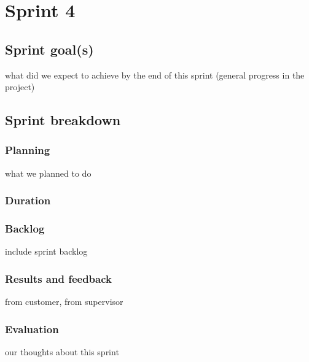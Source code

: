 

\chapter{Sprint 4}
\label{Sprint0}

\section{Sprint goal(s)}
what did we expect to achieve by the end of this sprint (general progress in the project)
\section{Sprint breakdown}
\subsection{Planning}
what we planned to do
\subsection{Duration}
\subsection{Backlog}
include sprint backlog
\subsection{Results and feedback}
from customer, from supervisor
\subsection{Evaluation}
our thoughts about this sprint